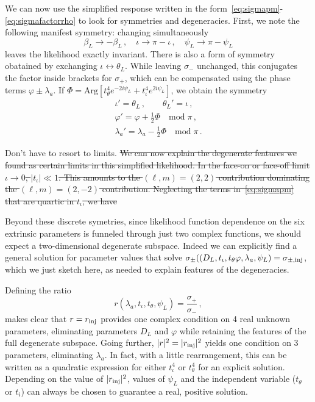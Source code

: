 \documentclass[aps,showpacs,twocolumn,prd,superscriptaddress,nofootinbib]{revtex4-1}
\newcommand{\be}{\begin{equation}}
\newcommand{\ee}{\end{equation}}
\newcommand{\bsub}{\begin{subequations}}
\newcommand{\esub}{\end{subequations}}
\newcommand{\nn}{\nonumber}
\newcommand\betaL{{\beta_{L}}}
\newcommand\psiL{{\psi_{L}}}
\newcommand{\jgb}[1]{{\color{DarkGreen} #1}}
\begin{document}
We can now use the simplified response written in the form~\eqref{eq:sigmapm}-\eqref{eq:sigmafactorrho} to look for symmetries and degeneracies. First, we note the following manifest symmetry: changing simultaneously
\be\label{eq:symmetryresponse}
	\betaL \rightarrow -\betaL\,, \quad \iota \rightarrow \pi - \iota \,, \quad \psiL \rightarrow \pi - \psiL
\ee
leaves the likelihood exactly invariant. There is also a form of symmetry obatained by exchanging $\iota \leftrightarrow \theta_{L}$. While leaving $\sigma_-$ unchanged, this conjugates the factor inside brackets for $\sigma_{+}$, which can be compensated using the phase terms $\varphi \pm \lambda_{a}$. If $\Phi = \mathrm{Arg} \left[ t_{\theta}^{4} e^{-2 i \psiL} + t_{\iota}^{4} e^{2 i \psiL} \right]$, we obtain the symmetry
\begin{align}
	\iota' = \theta_{L} \,, \qquad \theta_{L}' = \iota \,, \nn\\
	\varphi' = \varphi + \frac{1}{2} \Phi \quad \mathrm{mod} \; \pi\,, \nn\\
	\lambda_{a}' = \lambda_{a} - \frac{1}{2} \Phi \quad \mathrm{mod} \; \pi\,.
\end{align}

\jgb{Don't have to resort to limits.}
\sout{We can now explain the degenerate features we found as certain limits in this simplified likelihood. In the face-on or face-off limit $\iota \rightarrow 0$, $|t_{\iota}| \ll 1$. This amounts to the $(\ell,m)=(2,2)$ contribution dominating the $(\ell, m)=(2,-2)$ contribution. Neglecting the terms in~\eqref{eq:sigmapm} that are quartic in $t_{\iota}$, we have}

Beyond these discrete symetries, since likelihood function dependence on the six extrinsic parameters is funneled through just two complex functions, we should expect a two-dimensional degenerate subspace.  Indeed we can explicitly find a general solution for parameter values that solve $\sigma_{\pm}((D_{L}, t_\iota, t_\theta \varphi, \lambda_a, \psiL)=\sigma_{\pm,{\rm inj}}$, which we just sketch here, as needed to explain features of the degeneracies.

Defining the ratio
\be
	r(\lambda_a, t_\iota, t_\theta, \psiL) = \frac{\sigma_{+}}{\sigma_{-}} \,,
\ee
makes clear that $r=r_{\rm inj}$ provides one complex condition on 4 real unknown parameters, eliminating parameters $D_{L}$ and $\varphi$ while retaining the features of the full degenerate subspace.  Going further, $|r|^2=|r_{\rm inj}|^2$ yields one condition on 3 parameters, eliminating $\lambda_a$.  In fact, with a little rearrangement, this can be written as a quadratic expression for either $t_\iota^4$ or $t_\theta^4$ for an explicit solution.  Depending on the value of $|r_{\rm inj}|^2$, values of $\psiL$ and the independent variable ($t_\theta$ or $t_i$) can always be chosen to guarantee a real, positive solution.
\end{document}
